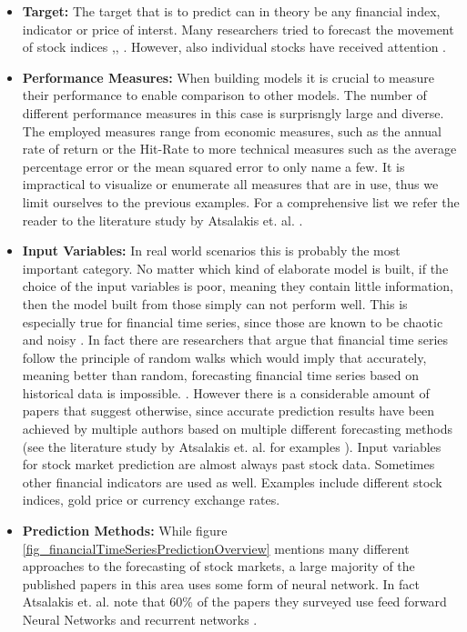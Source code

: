 \begin{itemize}
	\item \textbf{Target:} The target that is to predict can in theory be any financial index, indicator or price of interst. Many researchers tried to forecast the movement of stock indices \cite{zhang2009stock},\cite{van2001financial}, \cite{kumar2006forecasting} . However, also individual stocks have received attention \cite{mahfoud1996financial}. 
	\item \textbf{Performance Measures:} When building models it is crucial to measure their performance to enable comparison to other models. The number of different performance measures in this case is surprisngly large and diverse. The employed measures range from economic measures, such as the annual rate of return or the Hit-Rate to more technical measures such as the average percentage error or the mean squared error to only name a few. It is impractical to visualize or enumerate all measures that are in use, thus we limit ourselves to the previous examples. For a comprehensive list we refer the reader to the literature study by Atsalakis et. al. \cite{atsalakis2009surveying}.
	\item \textbf{Input Variables:} In real world scenarios this is probably the most important category. No matter which kind of elaborate model is built, if the choice of the input variables is poor, meaning they contain little information, then the model built from those simply can not perform well. This is especially true for financial time series, since those are known to be chaotic and noisy \cite{zhang2009stock}. In fact there are researchers that argue that financial time series follow the principle of random walks which would imply that accurately, meaning better than random, forecasting financial time series based on historical data is impossible. \cite{fama1965behavior}. However there is a considerable amount of papers that suggest otherwise, since accurate prediction results have been achieved by multiple authors based on multiple different forecasting methods (see the literature study by Atsalakis et. al. for examples \cite{atsalakis2009surveying} ). Input variables for stock market prediction are almost always past stock data. Sometimes other financial indicators are used as well. Examples include different stock indices, gold price or currency exchange rates.
	\item \textbf{Prediction Methods:} While figure \ref{fig_financialTimeSeriesPredictionOverview} mentions many different approaches to the forecasting of stock markets, a large majority of the published papers in this area uses some form of neural network. In fact Atsalakis et. al. note that 60\% of the papers they surveyed use feed forward Neural Networks and recurrent networks \cite{atsalakis2009surveying}. 
\end{itemize}

